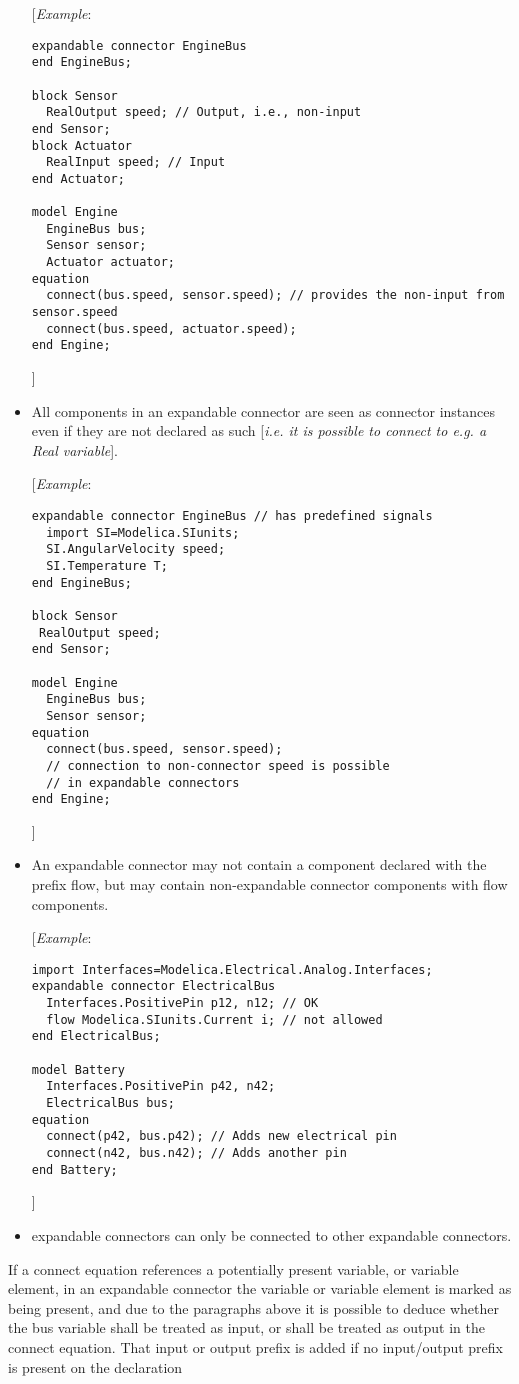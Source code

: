\begin{itemize}
{[}\emph{Example}:
\begin{lstlisting}[language=modelica]
expandable connector EngineBus
end EngineBus;

block Sensor
  RealOutput speed; // Output, i.e., non-input
end Sensor;
block Actuator
  RealInput speed; // Input
end Actuator;

model Engine
  EngineBus bus;
  Sensor sensor;
  Actuator actuator;
equation
  connect(bus.speed, sensor.speed); // provides the non-input from sensor.speed
  connect(bus.speed, actuator.speed);
end Engine;
\end{lstlisting}
{]}

\item
  All components in an expandable connector are seen as connector
  instances even if they are not declared as such {[}\emph{i.e. it is
  possible to connect to e.g. a Real variable}{]}.

{[}\emph{Example}:
\begin{lstlisting}[language=modelica]
expandable connector EngineBus // has predefined signals
  import SI=Modelica.SIunits;
  SI.AngularVelocity speed;
  SI.Temperature T;
end EngineBus;

block Sensor
 RealOutput speed;
end Sensor;

model Engine
  EngineBus bus;
  Sensor sensor;
equation
  connect(bus.speed, sensor.speed);
  // connection to non-connector speed is possible
  // in expandable connectors
end Engine;
\end{lstlisting}
{]}

\item
  An expandable connector may not contain a component declared with the
  prefix flow, but may contain non-expandable connector components with
  flow components.

{[}\emph{Example}:
\begin{lstlisting}[language=modelica]
import Interfaces=Modelica.Electrical.Analog.Interfaces;
expandable connector ElectricalBus
  Interfaces.PositivePin p12, n12; // OK
  flow Modelica.SIunits.Current i; // not allowed
end ElectricalBus;

model Battery
  Interfaces.PositivePin p42, n42;
  ElectricalBus bus;
equation
  connect(p42, bus.p42); // Adds new electrical pin
  connect(n42, bus.n42); // Adds another pin
end Battery;
\end{lstlisting}

{]}

\item
  expandable connectors can only be connected to other expandable
  connectors.
\end{itemize}
  If a connect equation references a potentially present variable, or
  variable element, in an expandable connector the variable or variable
  element is marked as being present, and due to the paragraphs above it
  is possible to deduce whether the bus variable shall be treated as
  input, or shall be treated as output in the connect equation. That
  input or output prefix is added if no input/output prefix is present
  on the declaration

